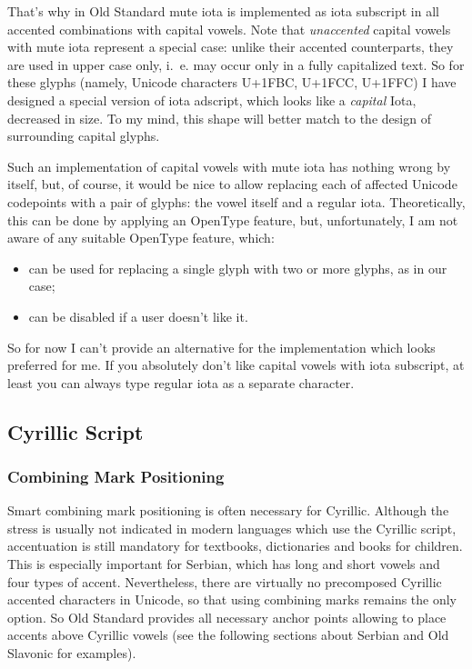 \documentclass[12pt,a4paper,openany]{book}
\begin{document}
That’s why in Old Standard mute iota is implemented as iota subscript in
all accented combinations with capital vowels. Note that \textit{unaccented}
capital vowels with mute iota represent a special case: unlike their
accented counterparts, they are used in upper case only, i.~e. may occur
only in a fully capitalized text. So for these glyphs (namely, Unicode
characters U+1FBC, U+1FCC, U+1FFC) I have designed a special version of
iota adscript, which looks like a \textit{capital} Iota, decreased in size.
To my mind, this shape will better match to the design of surrounding
capital glyphs.

Such an implementation of capital vowels with mute iota has nothing wrong
by itself, but, of course, it would be nice to allow replacing each of
affected Unicode codepoints with a pair of glyphs: the vowel itself and a
regular iota. Theoretically, this can be done by applying an OpenType
feature, but, unfortunately, I am not aware of any suitable OpenType
feature, which:

\begin{itemize}

\item can be used for replacing a single glyph with two or more glyphs, as in
our case;

\item can be disabled if a user doesn’t like it.

\end{itemize}

So for now I can’t provide an alternative for the implementation which
looks preferred for me. If you absolutely don’t like capital vowels with
iota subscript, at least you can always type regular iota as a separate
character.

\subsection{Cyrillic Script}

\subsubsection{Combining Mark Positioning}

Smart combining mark positioning is often necessary for Cyrillic.
Although the stress is usually not indicated in modern languages which use
the Cyrillic script, accentuation is still mandatory for textbooks,
dictionaries and books for children. This is especially important for
Serbian, which has long and short vowels and four types of accent.
Nevertheless, there are virtually no precomposed Cyrillic accented
characters in Unicode, so that using combining marks remains the only
option. So Old Standard provides all necessary anchor points allowing to
place accents above Cyrillic vowels (see the following sections about
Serbian and Old Slavonic for examples).
\end{document}
